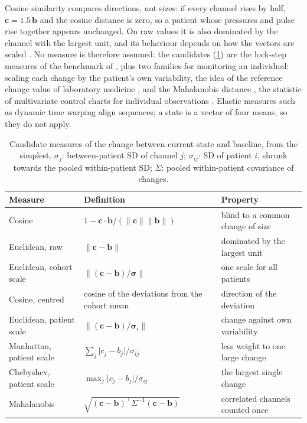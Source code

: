 \documentclass[11pt,a4paper,oneside]{report}
\begin{document}
Cosine similarity compares directions, not sizes: if every channel rises by half, $\mathbf{c} = 1.5\,\mathbf{b}$ and the cosine distance is zero, so a patient whose pressures and pulse rise together appears unchanged. On raw values it is also dominated by the channel with the largest unit, and its behaviour depends on how the vectors are scaled \parencite{steck2024}. No measure is therefore assumed: the candidates (\cref{tab:state-measures}) are the lock-step measures of the benchmark of \textcite{wang2013timeseries}, plus two families for monitoring an individual: scaling each change by the patient's own variability, the idea of the reference change value of laboratory medicine \parencite{fraser1989}, and the Mahalanobis distance \parencite{mahalanobis1936}, the statistic of multivariate control charts for individual observations \parencite{tracy1992}. Elastic measures such as dynamic time warping align sequences; a state is a vector of four means, so they do not apply.

\begin{table}[htbp]
\centering\footnotesize
\caption{Candidate measures of the change between current state and baseline, from the simplest. $\sigma_j$: between-patient SD of channel $j$; $\sigma_{ij}$: SD of patient $i$, shrunk towards the pooled within-patient SD; $\Sigma$: pooled within-patient covariance of changes.}\label{tab:state-measures}
\begin{tabularx}{\textwidth}{@{}>{\raggedright\arraybackslash}p{3.2cm} >{\raggedright\arraybackslash}p{4.6cm} X@{}}
\toprule
\textbf{Measure} & \textbf{Definition} & \textbf{Property} \\
\midrule
Cosine & $1 - \mathbf{c}\cdot\mathbf{b}/(\lVert\mathbf{c}\rVert\lVert\mathbf{b}\rVert)$ & blind to a common change of size \\
Euclidean, raw & $\lVert\mathbf{c} - \mathbf{b}\rVert$ & dominated by the largest unit \\
Euclidean, cohort scale & $\lVert(\mathbf{c} - \mathbf{b})/\boldsymbol{\sigma}\rVert$ & one scale for all patients \\
Cosine, centred & cosine of the deviations from the cohort mean & direction of the deviation \\
Euclidean, patient scale & $\lVert(\mathbf{c} - \mathbf{b})/\boldsymbol{\sigma}_i\rVert$ & change against own variability \\
Manhattan, patient scale & $\sum_j \lvert c_j - b_j\rvert/\sigma_{ij}$ & less weight to one large change \\
Chebyshev, patient scale & $\max_j \lvert c_j - b_j\rvert/\sigma_{ij}$ & the largest single change \\
Mahalanobis & $\sqrt{(\mathbf{c} - \mathbf{b})^{\top}\Sigma^{-1}(\mathbf{c} - \mathbf{b})}$ & correlated channels counted once \\
\bottomrule
\end{tabularx}
\end{table}
\end{document}
